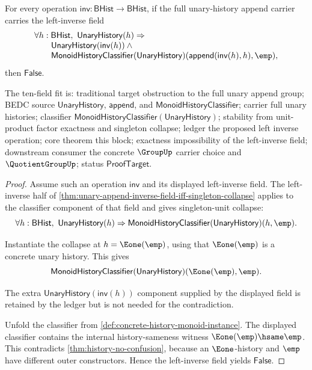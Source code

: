 \begin{theorem}
\label{thm:full-unary-append-left-inverse-obstruction}
For every operation $\mathsf{inv}:\mathsf{BHist}\to\mathsf{BHist}$, if the
full unary-history append carrier carries the left-inverse field
$$
\begin{array}{l}
\forall h:\mathsf{BHist},\
\mathsf{UnaryHistory}(h)\Rightarrow{}\\
\qquad
\mathsf{UnaryHistory}(\mathsf{inv}(h))\land{}\\
\qquad
\mathsf{MonoidHistoryClassifier}(\mathsf{UnaryHistory})
(\mathsf{append}(\mathsf{inv}(h),h),\emp),
\end{array}
$$
then $\mathsf{False}$.

The ten-field fit is: traditional target obstruction to the full unary append
group; BEDC source $\mathsf{UnaryHistory}$, $\mathsf{append}$, and
$\mathsf{MonoidHistoryClassifier}$; carrier full unary histories; classifier
$\mathsf{MonoidHistoryClassifier}(\mathsf{UnaryHistory})$; stability from
unit-product factor exactness and singleton collapse; ledger the proposed left
inverse operation; core theorem this block; exactness impossibility of the
left-inverse field; downstream consumer the concrete $\GroupUp$ carrier choice
and $\QuotientGroupUp$; status $\mathsf{ProofTarget}$.
\end{theorem}
\begin{proof}
Assume such an operation $\mathsf{inv}$ and its displayed left-inverse field.
The left-inverse half of
\autoref{thm:unary-append-inverse-field-iff-singleton-collapse} applies to the
classifier component of that field and gives singleton-unit collapse:
$$
\forall h:\mathsf{BHist},\
\mathsf{UnaryHistory}(h)\Rightarrow
\mathsf{MonoidHistoryClassifier}(\mathsf{UnaryHistory})(h,\emp).
$$

Instantiate the collapse at $h=\Eone(\emp)$, using that $\Eone(\emp)$ is a
concrete unary history. This gives
$$
\mathsf{MonoidHistoryClassifier}(\mathsf{UnaryHistory})
(\Eone(\emp),\emp).
$$

The extra $\mathsf{UnaryHistory}(\mathsf{inv}(h))$ component supplied by the
displayed field is retained by the ledger but is not needed for the
contradiction.

Unfold the classifier from \autoref{def:concrete-history-monoid-instance}. The
displayed classifier contains the internal history-sameness witness
$\Eone(\emp)\hsame\emp$. This contradicts
\autoref{thm:history-no-confusion}, because an $\Eone$-history and $\emp$ have
different outer constructors. Hence the left-inverse field yields
$\mathsf{False}$.
\end{proof}
